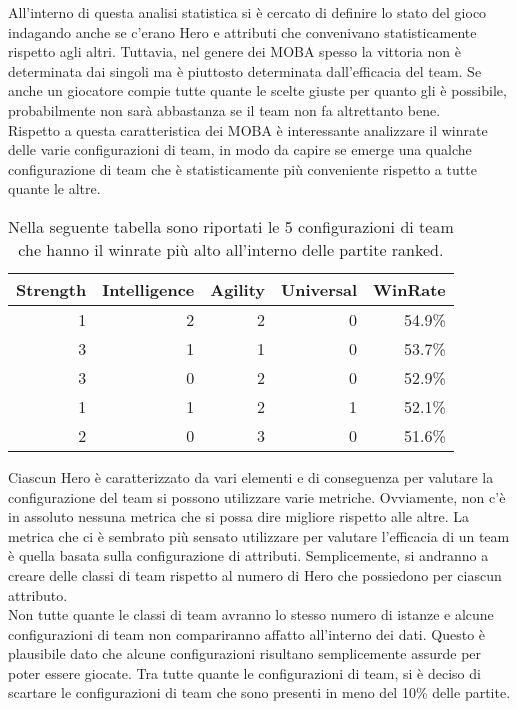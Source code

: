 All'interno di questa analisi statistica si è cercato di definire lo stato del gioco indagando anche se c'erano Hero e attributi che convenivano statisticamente rispetto agli altri. Tuttavia, nel genere dei MOBA spesso la vittoria non è determinata dai singoli ma è piuttosto determinata dall'efficacia del team. Se anche un giocatore compie tutte quante le scelte giuste per quanto gli è possibile, probabilmente non sarà abbastanza se il team non fa altrettanto bene. \\
Rispetto a questa caratteristica dei MOBA è interessante analizzare il winrate delle varie configurazioni di team, in modo da capire se emerge una qualche configurazione di team che è statisticamente più conveniente rispetto a tutte quante le altre. \\
\begin{table}
\centering
\caption{Nella seguente tabella sono riportati le 5 configurazioni di team che hanno il winrate più alto all'interno delle partite ranked. }
\label{tabella_winrate_team_ranked}
\begin{tabular}{|r|r|r|r|r|}
\hline
\multicolumn{1}{|l|}{Strength} & \multicolumn{1}{l|}{Intelligence} & \multicolumn{1}{l|}{Agility} & \multicolumn{1}{l|}{Universal} & \multicolumn{1}{l|}{WinRate} \\ \hline
1 & 2 & 2 & 0 &   54.9\% \\ \hline
3 & 1 & 1 & 0 &   53.7\%  \\ \hline
3 & 0 & 2 & 0 &   52.9\% \\ \hline
1 & 1 & 2 & 1 &   52.1\%  \\ \hline
2 & 0 & 3 & 0 &   51.6\% \\ \hline
\end{tabular}
\end{table}
Ciascun Hero è caratterizzato da vari elementi e di conseguenza per valutare la configurazione del team si possono utilizzare varie metriche. Ovviamente, non c'è in assoluto nessuna metrica che si possa dire migliore rispetto alle altre. La metrica che ci è sembrato più sensato utilizzare per valutare l'efficacia di un team è quella basata sulla configurazione di attributi. Semplicemente, si andranno a creare delle classi di team rispetto al numero di Hero che possiedono per ciascun attributo. \\
Non tutte quante le classi di team avranno lo stesso numero di istanze e alcune configurazioni di team non compariranno affatto all'interno dei dati. Questo è plausibile dato che alcune configurazioni risultano semplicemente assurde per poter essere giocate. Tra tutte quante le configurazioni di team, si è deciso di scartare le configurazioni di team che sono presenti in meno del 10\% delle partite. \\
